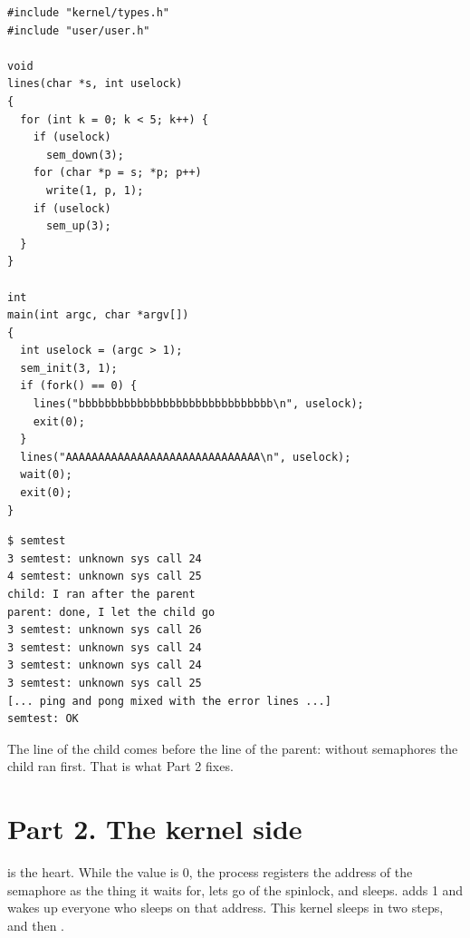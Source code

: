 \documentclass[11pt,a4paper]{article}
\begin{document}
\begin{lstlisting}[style=ccode,caption={user/mix.c}]
#include "kernel/types.h"
#include "user/user.h"

void
lines(char *s, int uselock)
{
  for (int k = 0; k < 5; k++) {
    if (uselock)
      sem_down(3);
    for (char *p = s; *p; p++)
      write(1, p, 1);
    if (uselock)
      sem_up(3);
  }
}

int
main(int argc, char *argv[])
{
  int uselock = (argc > 1);
  sem_init(3, 1);
  if (fork() == 0) {
    lines("bbbbbbbbbbbbbbbbbbbbbbbbbbbbbb\n", uselock);
    exit(0);
  }
  lines("AAAAAAAAAAAAAAAAAAAAAAAAAAAAAA\n", uselock);
  wait(0);
  exit(0);
}
\end{lstlisting}

\begin{lstlisting}[caption={Check 1: the calls reach a kernel that does not know them yet}]
$ semtest
3 semtest: unknown sys call 24
4 semtest: unknown sys call 25
child: I ran after the parent
parent: done, I let the child go
3 semtest: unknown sys call 26
3 semtest: unknown sys call 24
3 semtest: unknown sys call 24
3 semtest: unknown sys call 25
[... ping and pong mixed with the error lines ...]
semtest: OK
\end{lstlisting}

The line of the child comes before the line of the parent: without semaphores the child ran
first. That is what Part 2 fixes.

\section{Part 2. The kernel side}

 is the heart. While the value is 0, the process registers the address of the
semaphore as the thing it waits for, lets go of the spinlock, and sleeps.  adds 1
and wakes up everyone who sleeps on that address. This kernel sleeps in two steps,
 and then .
\end{document}

